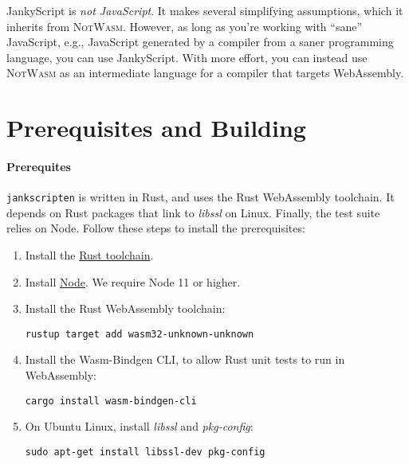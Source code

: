 \documentclass{article}
\newcommand{\system}{\texttt{jankscripten}\xspace}
\newcommand{\notwasm}{\textsc{NotWasm}\xspace}
\newcommand{\jankyscript}{JankyScript\xspace}
\begin{document}
\jankyscript is \emph{not JavaScript}. It makes several simplifying
assumptions, which it inherits from \notwasm. However, as long as you're
working with ``sane'' JavaScript, e.g., JavaScript generated by a compiler from
a saner programming language, you can use JankyScript. With more effort, you
can instead use \notwasm as an intermediate language for a compiler that
targets WebAssembly.

\section{Prerequisites and Building}

\paragraph{Prerequites}
\system is written in Rust, and uses the Rust WebAssembly toolchain. It depends
on Rust packages that link to \emph{libssl} on Linux. Finally, the test suite
relies on Node. Follow these steps to install the prerequisites:

\begin{enumerate}

\item Install the \href{https://rustup.rs/}{Rust toolchain}.

\item Install \href{https://nodejs.org/en/}{Node}. We require Node 11 or higher.

\item Install the Rust WebAssembly toolchain:

\begin{verbatim}
rustup target add wasm32-unknown-unknown
\end{verbatim}

\item Install the Wasm-Bindgen CLI, to allow Rust unit tests to run in WebAssembly:

\begin{verbatim}
cargo install wasm-bindgen-cli
\end{verbatim}

\item On Ubuntu Linux, install \emph{libssl} and \emph{pkg-config}:

\begin{verbatim}
sudo apt-get install libssl-dev pkg-config
\end{verbatim}

\end{enumerate}
\end{document}
